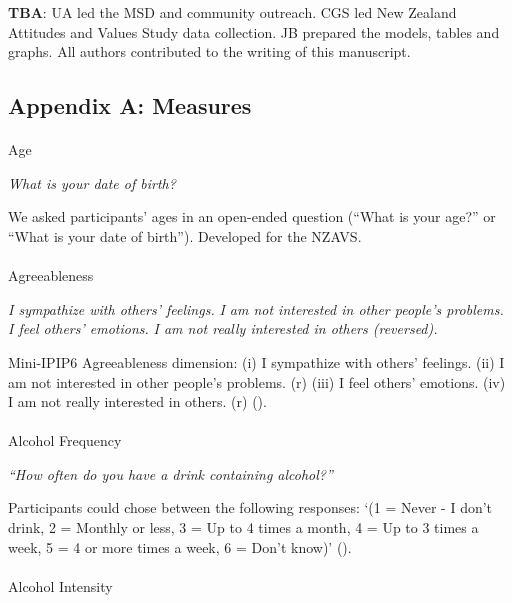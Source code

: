 \documentclass[
  single column]{article}
\makeatletter
\let\oldparagraph\paragraph
\renewcommand{\paragraph}{
    \@ifstar
      \xxxParagraphStar
      \xxxParagraphNoStar
  }
\newcommand{\xxxParagraphStar}[1]{\oldparagraph*{#1}\mbox{}}
\newcommand{\xxxParagraphNoStar}[1]{\oldparagraph{#1}\mbox{}}
\makeatother
\begin{document}
\textbf{TBA}: UA led the MSD and community outreach. CGS led New Zealand
Attitudes and Values Study data collection. JB prepared the models,
tables and graphs. All authors contributed to the writing of this
manuscript.

\newpage{}

\subsection{Appendix A: Measures}\label{appendix-a}

\paragraph{Age}\label{age}

\emph{What is your date of birth?}

We asked participants' ages in an open-ended question (``What is your
age?'' or ``What is your date of birth''). Developed for the NZAVS.

\paragraph{Agreeableness}\label{agreeableness}

\emph{I sympathize with others' feelings.} \emph{I am not interested in
other people's problems.} \emph{I feel others' emotions.} \emph{I am not
really interested in others (reversed).}

Mini-IPIP6 Agreeableness dimension: (i) I sympathize with others'
feelings. (ii) I am not interested in other people's problems. (r) (iii)
I feel others' emotions. (iv) I am not really interested in others. (r)
().

\paragraph{Alcohol Frequency}\label{alcohol-frequency}

\emph{``How often do you have a drink containing alcohol?''}

Participants could chose between the following responses: `(1 = Never -
I don't drink, 2 = Monthly or less, 3 = Up to 4 times a month, 4 = Up to
3 times a week, 5 = 4 or more times a week, 6 = Don't know)'
().

\paragraph{Alcohol Intensity}\label{alcohol-intensity}
\end{document}
